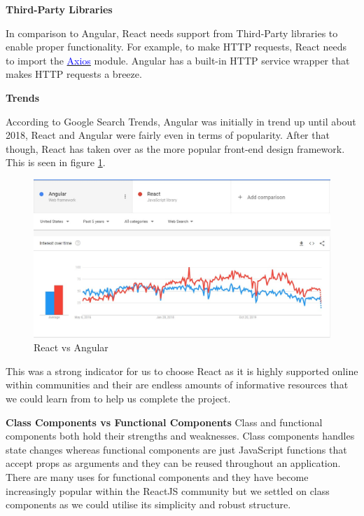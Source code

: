 \textbf{Third-Party Libraries}

In comparison to Angular, React needs support from Third-Party libraries to enable proper functionality. For example, to make HTTP requests, React needs to import the \href{https://github.com/axios/axios}{\textcolor{blue}{Axios}} module. Angular has a built-in HTTP service wrapper that makes HTTP requests a breeze.

\textbf{Trends}

According to Google Search Trends, Angular was initially in trend up until about 2018, React and Angular were fairly even in terms of popularity. After that though, React has taken over as the more popular front-end design framework. This is seen in figure \ref{fig:React vs Angular}.

\begin{figure}[H]
  \centering
  \includegraphics[scale=0.45]{img/react_vs_angular.jpg}
  \caption{React vs Angular}
  \label{fig:React vs Angular}
\end{figure}

This was a strong indicator for us to choose React as it is highly supported online within communities and their are endless amounts of informative resources that we could learn from to help us complete the project.

\item \textbf{Class Components vs Functional Components}
Class and functional components both hold their strengths and weaknesses. Class components handles state changes whereas functional components are just JavaScript functions that accept props as arguments and they can be reused throughout an application. There are many uses for functional components and they have become increasingly popular within the ReactJS community but we settled on class components as we could utilise its simplicity and robust structure.

